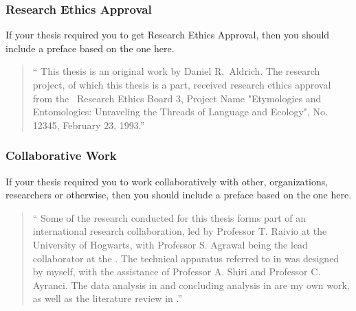


			\subsubsection{Research Ethics Approval}\label{preface:REA}
				If your thesis required you to get Research Ethics Approval, then you should include a preface based on the one here.

				\begin{quote}
					\enquote{%
						This thesis is an original work by Daniel R.\ Aldrich. 
						The research project, of which this thesis is a part, received research ethics approval from the \University\ Research Ethics Board 3, Project Name "Etymologies and Entomologies: Unraveling the Threads of Language and Ecology", No. 12345, February 23, 1993.}%
				\end{quote}

			\subsubsection{Collaborative Work}\label{preface:CW}
				If your thesis required you to work collaboratively with other, organizations, researchers or otherwise, then you should include a preface based on the one here.

				\begin{quote}
					\enquote{%
						Some of the research conducted for this thesis forms part of an international research collaboration, led by Professor T. Raivio at the University of Hogwarts, with Professor S. Agrawal being the lead collaborator at the \University. 
						The technical apparatus referred to in  was designed by myself, with the assistance of Professor A. Shiri and Professor C. Ayranci. 
						The data analysis in  and concluding analysis in  are my own work, as well as the literature review in .}
				\end{quote}

